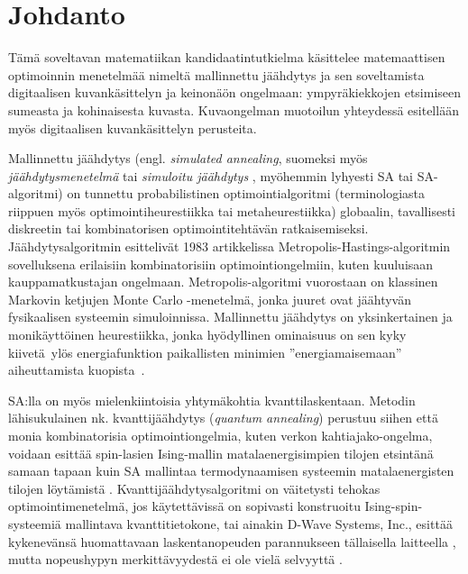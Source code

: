 \chapter{Johdanto}
\label{cha:johdanto}


Tämä soveltavan matematiikan kandidaatintutkielma käsittelee matemaattisen optimoinnin menetelmää nimeltä mallinnettu jäähdytys ja sen soveltamista digitaalisen kuvankäsittelyn ja keinonäön ongelmaan: ympyräkiekkojen etsimiseen sumeasta ja kohinaisesta kuvasta.
Kuvaongelman muotoilun yhteydessä esitellään myös digitaalisen kuvankäsittelyn perusteita.

Mallinnettu jäähdytys (engl. \emph{simulated annealing}, suomeksi myös \emph{jäähdytysmenetelmä} tai \emph{simuloitu jäähdytys} \cite[suomennokset ks.][]{haataja93}, myöhemmin lyhyesti SA tai SA-algoritmi) on tunnettu probabilistinen optimointialgoritmi (terminologiasta riippuen myös optimointiheurestiikka tai metaheurestiikka) globaalin, tavallisesti diskreetin tai kombinatorisen optimointitehtävän ratkaisemiseksi.
Jäähdytysalgoritmin esittelivät \citeauthor*{kirkpatrick83} 1983 artikkelissa \cite{kirkpatrick83} Metropolis-Hastings-algoritmin sovelluksena erilaisiin kombinatorisiin optimointiongelmiin, kuten kuuluisaan kauppamatkustajan ongelmaan.
Metropolis-algoritmi vuorostaan on klassinen Markovin ketjujen Monte Carlo -menetelmä, jonka juuret ovat jäähtyvän fysikaalisen systeemin simuloinnissa.
Mallinnettu jäähdytys on yksinkertainen ja monikäyttöinen heurestiikka,
jonka hyödyllinen ominaisuus on sen kyky kiivetä ylös energiafunktion paikallisten minimien ''energiamaisemaan'' aiheuttamista kuopista~\cite{salamonetal}.

SA:lla on myös mielenkiintoisia yhtymäkohtia kvanttilaskentaan.
Metodin lähisukulainen nk. kvanttijäähdytys (\emph{quantum annealing}) perustuu siihen että monia kombinatorisia optimointiongelmia,
kuten verkon kahtiajako-ongelma, voidaan esittää spin-lasien Ising-mallin matalaenergisimpien tilojen etsintänä samaan tapaan kuin SA mallintaa termodynaamisen systeemin matalaenergisten tilojen löytämistä \cites[luku 4.5]{laarhoven}[]{johnson11dwave}.
Kvanttijäähdytysalgoritmi on väitetysti tehokas optimointimenetelmä, jos käytettävissä on sopivasti konstruoitu Ising-spin-systeemiä mallintava kvanttitietokone,
tai ainakin D-Wave Systems, Inc., esittää kykenevänsä huomattavaan laskentanopeuden parannukseen tällaisella laitteella \cite{johnson11dwave, denchev2015},
mutta nopeushypyn merkittävyydestä ei ole vielä selvyyttä \cite{troyer2015}.

